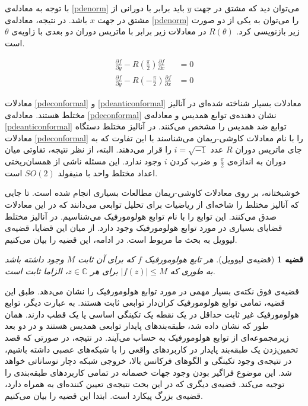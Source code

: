 \documentclass[12pt,onecolumn,a4paper]{article}
\newtheorem{theorem}{قضیه}[section]
\begin{document}
با توجه به معادله‌ی \ref{pdenorm} 
می‌توان دید که مشتق در جهت $y$ 
باید برابر با دورانی از مشتق در جهت $x$ 
باشد. در نتیجه، معادله‌ی \ref{pdenorm} 
را می‌توان به یکی از دو صورت زیر بازنویسی کرد. 
$R(\theta)$ 
در معادلات زیر برابر با ماتریس دوران دو بعدی با زاویه‌ی $\theta$ 
است.

\begin{align}
    \frac{\partial f}{\partial y} - R(\frac{\pi}{2})\frac{\partial f}{\partial x}&=0\label{pdeconformal}\\
    \frac{\partial f}{\partial y} - R(-\frac{\pi}{2})\frac{\partial f}{\partial x}&=0\label{pdeanticonformal}
\end{align}

معادلات \ref{pdeconformal} و \ref{pdeanticonformal} 
معادلات بسیار شناخته شده‌ای در آنالیز مختلط هستند. معادله‌ی \ref{pdeconformal} 
نشان دهنده‌ی توابع همدیس
و معادله‌ی \ref{pdeanticonformal} 
توابع ضد همدیس را مشخص می‌کنند. در آنالیز مختلط دستگاه معادلات \ref{pdeconformal} 
را با نام معادلات کاوشی-ریمان می‌شناسند با این تفاوت که به جای ماتریس دوران $R$ عدد $i=\sqrt{-1}$ 
را قرار می‌دهند. البته، از نظر نتیجه، تفاوتی میان دوران به اندازه‌ی $\frac{\pi}{2}$ 
و ضرب کردن $i$ 
وجود ندارد. این مسئله ناشی از همسان‌ریختی 
اعداد مختلط واحد با منیفولد $SO(2)$ 
است.

خوشبختانه، بر روی معادلات کاوشی-ریمان مطالعات بسیاری انجام شده است. تا جایی که آنالیز مختلط را شاخه‌ای از ریاضیات برای تحلیل توابعی می‌دانند که در این معادلات صدق می‌کنند. این توابع را با نام توابع هولومورفیک 
می‌شناسیم. در آنالیز مختلط قضایای بسیاری در مورد توابع هولومورفیک وجود دارد. از میان این قضایا، قضیه‌ی لیوویل 
به بحث ما مربوط است. در ادامه، این قضیه را بیان می‌کنیم.

\begin{theorem}[قضیه‌ی لیوویل]
    هر تابع هولومورفیک $f$ 
    که برای آن ثابت $M$ 
    وجود داشته باشد به طوری که $|f(z)|\leq M$ 
    برای هر $z\in \mathbb{C}$، 
    الزاما ثابت است.
\end{theorem}

قضیه‌ی فوق نکته‌ی بسیار مهمی در مورد توابع هولومورفیک را نشان می‌دهد. طبق این قضیه، تمامی توابع هولومورفیک کران‌دار توابعی ثابت هستند. به عبارت دیگر، توابع هولومورفیک غیر ثابت حداقل در یک نقطه یک تکینگی اساسی یا یک قطب دارند. همان طور که نشان داده شد، طبقه‌بندهای پایدار توابعی همدیس هستند و در دو بعد زیرمجموعه‌ای از توابع هولومورفیک به حساب می‌آیند. در نتیجه، در صورتی که قصد تخمین‌زدن یک طبقه‌بند پایدار در کاربردهای واقعی را با شبکه‌های عصبی داشته باشیم، در نتیجه‌ی وجود تکینگی و الگوهای فرکانس بالا، خروجی شبکه دچار نوساناتی خواهد شد. این موضوع فراگیر بودن وجود جهات خصمانه در تمامی کاربردهای طبقه‌بندی را توجیه می‌کند. قضیه‌ی دیگری که در این بحث نتیجه‌ی تعیین کننده‌ای به همراه دارد، قضیه‌ی بزرگ پیکارد 
است. ابتدا این قضیه را بیان می‌کنیم.
\end{document}
